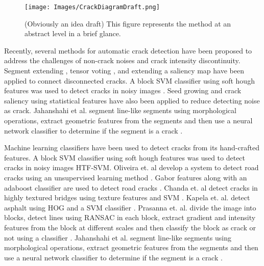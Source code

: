     \begin{figure}
    
        \begin{centering}
        
            \texttt{[image: Images/CrackDiagramDraft.png]}
        
            \caption{(Obviously an idea draft) This figure represents the method at an abstract level in a brief glance.}
            \label{fig:FigMain}
            
        \end{centering}
        
    \end{figure}

    Recently, several methods for automatic crack detection have been proposed to address the challenges of non-crack noises and crack intensity discontinuity. Segment extending \cite{Liu2008}, tensor voting \cite{Zou2012}, and extending a saliency map \cite{Xu2013} have been applied to connect disconnected cracks. A block SVM classifier using soft hough features was used to detect cracks in noisy images \cite{Hu2010}. Seed growing \cite{Li2011} and crack saliency \cite{Xu2013} using statistical features have also been applied to reduce detecting noise as crack. Jahanshahi et al. segment line-like segments using morphological operations, extract geometric features from the segments and then use a neural network classifier to determine if the segment is a crack \cite{jahanshahi2013}.

    Machine learning classifiers have been used to detect cracks from its hand-crafted features. A block SVM classifier using soft hough features was used to detect cracks in noisy images HTF-SVM. Oliveira et. al develop a system to detect road cracks using an unsupervised learning method \cite{Oliveira2013} \cite{Oliveira2014}.  Gabor features along with an adaboost classifier are used to detect road cracks \cite{Medina2014}.  Chanda et. al  detect cracks in highly textured bridges using texture features and SVM \cite{chanda2014}. Kapela et. al. detect asphalt using HOG and a SVM classifier \cite{Kapela2015}. Prasanna et. al. divide the image into blocks, detect lines using RANSAC in each block, extract gradient and intensity features from the block at different scales and then classify the block as crack or not using a classifier \cite{Prasanna2014}. Jahanshahi et al. segment line-like segments using morphological operations, extract geometric features from the segments and then use a neural network classifier to determine if the segment is a crack \cite{jahanshahi2013}. 

